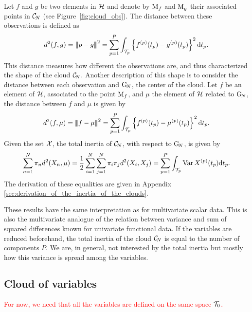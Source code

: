 Let $f$ and $g$ be two elements in $\mathcal{H}$ and denote by $\mathrm{M}_f$ and $\mathrm{M}_g$ their associated points in $\mathcal{C}_{\!N}$ (see Figure~\ref{fig:cloud_obs}). The distance between these observations is defined as
\begin{equation}\label{eq:distance_obs}
    d^2(f, g) = \left|\!\left|\!\left|p - g\right|\!\right|\!\right|^2 = \sum_{p = 1}^P \int_{\mathcal{T}_{p}}\left\{f^{(p)}(t_p) - g^{(p)}(t_p)\right\}^2 {\rm d} t_p.
\end{equation}
This distance measures how different the observations are, and thus characterized the shape of the cloud $\mathcal{C}_{\!N}$. Another description of this shape is to consider the distance between each observation and $\mathrm{G}_{\!N}$, the center of the cloud. Let $f$ be an element of $\mathcal{H}$, associated to the point $\mathrm{M}_f$, and $\mu$ the element of $\mathcal{H}$ related to $\mathrm{G}_{\!N}$, the distance between $f$ and $\mu$ is given by
\begin{equation}\label{eq:distance_center}
    d^2(f, \mu) = \left|\!\left|\!\left|f - \mu\right|\!\right|\!\right|^2 = \sum_{p = 1}^P \int_{\mathcal{T}_{p}}\left\{f^{(p)}(t_p) - \mu^{(p)}(t_p)\right\}^2 {\rm d} t_p.
\end{equation}
Given the set $\mathcal{X}$, the total inertia of $\mathcal{C}_{\!N}$, with respect to $\mathrm{G}_{\!N}$, is given by
\begin{equation}\label{eq:inertia}
    \sum_{n = 1}^N \pi_n d^2(X_n, \mu) = \frac{1}{2}\sum_{i = 1}^N \sum_{j = 1}^N \pi_i \pi_j d^2(X_i, X_j) = \sum_{p = 1}^P \int_{\mathcal{T}_{p}}\operatorname{Var}{X^{(p)}(t_p)} {\rm d} t_p.
\end{equation}
The derivation of these equalities are given in Appendix \ref{sec:derivation_of_the_inertia_of_the_clouds}.

\begin{remark}
    These results have the same interpretation as for multivariate scalar data. This is also the multivariate analogue of the relation between variance and sum of squared differences known for univariate functional data. If the variables are reduced beforehand, the total inertia of the cloud $\mathcal{C}_{\!N}$ is equal to the number of components $P$. We are, in general, not interested by the total inertia but mostly how this variance is spread among the variables.
\end{remark}


\subsection{Cloud of variables} %
\label{sub:cloud_of_variables}

\textcolor{red}{For now, we need that all the variables are defined on the same space $\mathcal{T}_{0}$.}

